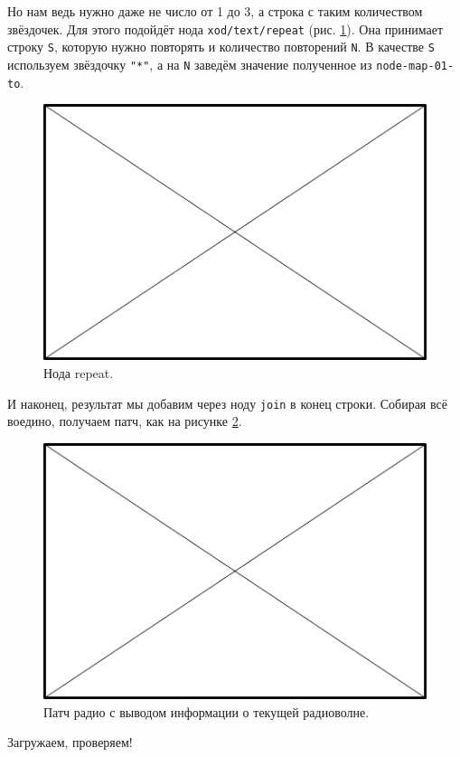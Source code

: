 Но нам ведь нужно даже не число от 1 до 3, а строка с таким количеством звёздочек. Для этого подойдёт нода \texttt{xod/text/repeat} (рис. \ref{patch:node-repeat}). Она принимает строку \texttt{S}, которую нужно повторять и количество повторений \texttt{N}. В качестве \texttt{S} используем звёздочку \texttt{"*"}, а на \texttt{N} заведём значение полученное из \texttt{node-map-01-to}.

\begin{figure}
  \centering
  \includegraphics{TODO}
  \caption{Нода repeat.}
  \label{patch:node-repeat}
\end{figure}

И наконец, результат мы добавим через ноду \texttt{join} в конец строки. Собирая всё воедино, получаем патч, как на рисунке \ref{patch:fm-lcd-line-1}.

\begin{figure}
  \centering
  \includegraphics{TODO}
  \caption{Патч радио с выводом информации о текущей радиоволне.}
  \label{patch:fm-lcd-line-1}
\end{figure}

Загружаем, проверяем!

